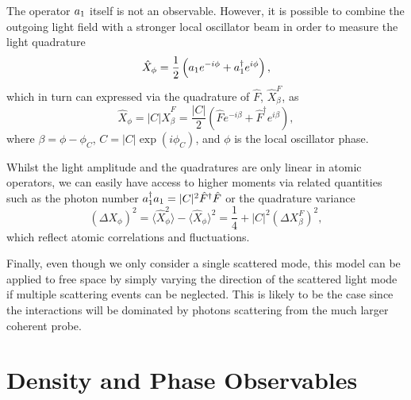 The operator $a_1$ itself is not an observable. However, it is
possible to combine the outgoing light field with a stronger local
oscillator beam in order to measure the light quadrature
\begin{equation}
  \hat{X}_\phi = \frac{1}{2} \left( a_1 e^{-i \phi} + a^\dagger_1 e^{i \phi} \right),
\end{equation}
which in turn can expressed via the quadrature of $\hat{F}$,
$\hat{X}^F_\beta$, as
\begin{equation}
  \hat{X}_\phi = |C| \hat{X}_\beta^F = \frac{|C|}{2} \left( \hat{F}
    e^{-i \beta} + \hat{F}^\dagger e^{i \beta} \right),
\end{equation}
where $\beta = \phi - \phi_C$, $C = |C| \exp(i \phi_C)$, and $\phi$ is
the local oscillator phase.

Whilst the light amplitude and the quadratures are only linear in
atomic operators, we can easily have access to higher moments via
related quantities such as the photon number
$a^\dagger_1 a_1 = |C|^2 \hat{F}^\dagger \hat{F}$ or the quadrature
variance
\begin{equation}
  \label{eq:Xvar}
  ( \Delta X_\phi )^2 = \langle \hat{X}_\phi^2 \rangle - \langle
  \hat{X}_\phi \rangle^2 = \frac{1}{4} + |C|^2 (\Delta X^F_\beta)^2,
\end{equation}
which reflect atomic correlations and fluctuations.

Finally, even though we only consider a single scattered mode, this
model can be applied to free space by simply varying the direction of
the scattered light mode if multiple scattering events can be
neglected. This is likely to be the case since the interactions will
be dominated by photons scattering from the much larger coherent
probe.

\section{Density and Phase Observables}
\label{sec:B}

